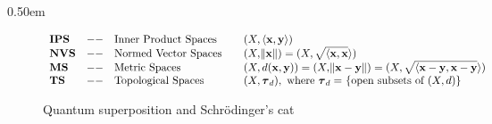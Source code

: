 \documentclass[11pt, oneside]{article}   	%
\begin{document}
\setlength {\fboxsep} {0.50em}							%
\setlength {\fboxrule}{0.75pt}							%
\begin{figure}[H]										%
  \centering											%
   {							%
	 \resizebox{1.00\textwidth}{!} {
	    \begin{math}
          \begin{array}{llllll}
            {\bf IPS} &--& \text{Inner Product Spaces}	&&	(X,\langle {\bf x},{\bf y} \rangle)\\
            {\bf NVS} &--& \text{Normed Vector Spaces}	&&	(X,\norm{\bf x}) = (X,\sqrt{\langle \bf {x}, \bf{x}} \rangle) \\
            {\bf MS}  &--& \text{Metric Spaces}			&&	(X,d({\bf x},{\bf y})) = (X, \norm{{\bf x} - {\bf y}}) = 
                                                			(X,\sqrt{\langle {\bf x} - {\bf y},{\bf x} - {\bf y}}\rangle)\\
            {\bf TS}  &--& \text{Topological Spaces}	&&	(X, {\boldsymbol \tau_d)}, \text{ where ${\boldsymbol \tau_d = }$ 
            												\{open subsets of $(X, d)$\}}
           \end{array}
        \end{math}
     }
  }
\end{figure}


\newpage
    
             
\begin{figure}
 \caption{Quantum superposition and Schrödinger's cat}
 \end{figure}
\end{document}
